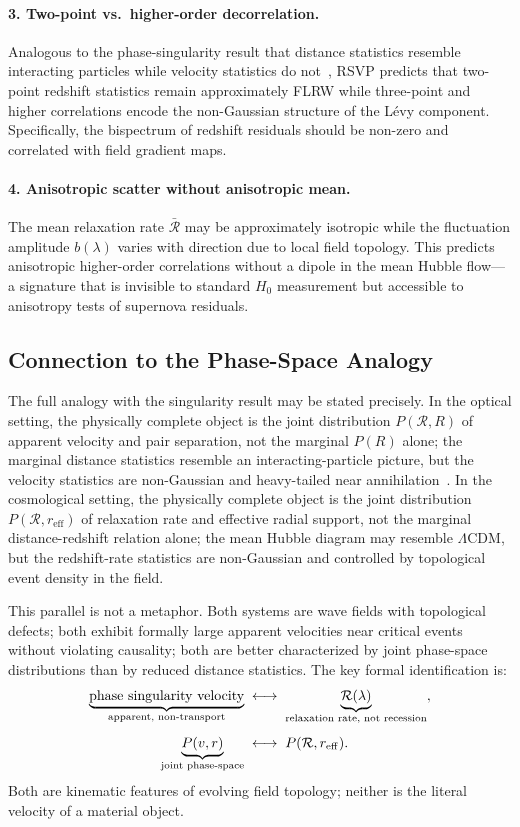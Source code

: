 \documentclass[12pt,a4paper]{article}
\theoremstyle{remark}
\newcommand{\Rcal}{\mathcal{R}}
\begin{document}
\paragraph{3. Two-point vs.\ higher-order decorrelation.}
Analogous to the phase-singularity result that distance statistics resemble
interacting particles while velocity statistics do not~\cite{bucher2026},
RSVP predicts that two-point redshift statistics remain approximately FLRW
while three-point and higher correlations encode the non-Gaussian structure of
the L\'{e}vy component. Specifically, the bispectrum of redshift residuals
should be non-zero and correlated with field gradient maps.

\paragraph{4. Anisotropic scatter without anisotropic mean.}
The mean relaxation rate $\bar{\Rcal}$ may be approximately isotropic while
the fluctuation amplitude $b(\lambda)$ varies with direction due to local
field topology. This predicts anisotropic higher-order correlations without
a dipole in the mean Hubble flow---a signature that is invisible to standard
$H_0$ measurement but accessible to anisotropy tests of supernova residuals.

\subsection{Connection to the Phase-Space Analogy}

The full analogy with the singularity result may be stated precisely. In the
optical setting, the physically complete object is the joint distribution
$P(\mathcal{R}, R)$ of apparent velocity and pair separation, not the marginal
$P(R)$ alone; the marginal distance statistics resemble an interacting-particle
picture, but the velocity statistics are non-Gaussian and heavy-tailed near
annihilation~\cite{bucher2026}. In the cosmological setting, the physically
complete object is the joint distribution $P(\Rcal, r_{\mathrm{eff}})$ of
relaxation rate and effective radial support, not the marginal distance-redshift
relation alone; the mean Hubble diagram may resemble $\Lambda$CDM, but the
redshift-rate statistics are non-Gaussian and controlled by topological event
density in the field.

This parallel is not a metaphor. Both systems are wave fields with topological
defects; both exhibit formally large apparent velocities near critical events
without violating causality; both are better characterized by joint phase-space
distributions than by reduced distance statistics. The key formal identification
is:
\begin{align}
\underbrace{\text{phase singularity velocity}}_{\text{apparent, non-transport}}
&\;\longleftrightarrow\;
\underbrace{\Rcal(\lambda)}_{\text{relaxation rate, not recession}}, \notag\\[0.4em]
\underbrace{P(v, r)}_{\text{joint phase-space}}
&\;\longleftrightarrow\;
P(\Rcal, r_{\mathrm{eff}}).
\end{align}
Both are kinematic features of evolving field topology; neither is the literal
velocity of a material object.
\end{document}
